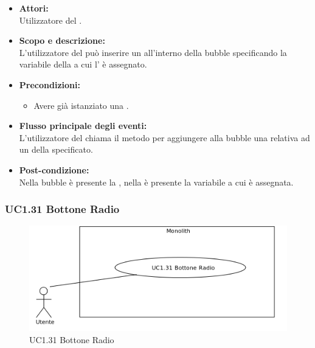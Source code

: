 \begin{itemize}
	\item \textbf{Attori:}
	\\Utilizzatore del .
	\item \textbf{Scopo e descrizione:} 
	\\L’utilizzatore del  può inserire un   all’interno della bubble specificando la variabile della  a cui l' è assegnato.
	\item \textbf{Precondizioni:}
	\begin{itemize}
		\item Avere già istanziato una .
	\end{itemize}
	\item \textbf{Flusso principale degli eventi:}
	\\L’utilizzatore del  chiama il metodo per aggiungere alla bubble una  relativa ad un  della  specificato.
	\item \textbf{Post-condizione:}
	\\Nella bubble è presente la , nella  è presente la variabile a cui è assegnata.
\end{itemize}

\subsubsection{UC1.31 Bottone Radio} \label{UC1.31}

\begin{figure}[H]
	\centering
	\includegraphics[width=15cm]{../../documenti/AnalisiDeiRequisiti/Diagrammi_img/uc1_31.png}
	\caption{UC1.31 Bottone Radio}
\end{figure}

